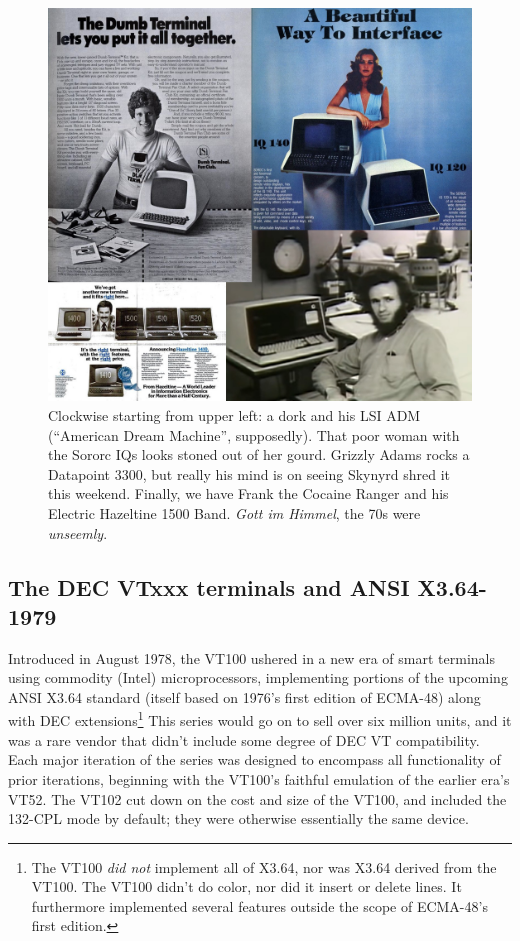 \documentclass[letterpaper,10pt]{article}
\begin{document}
\begin{figure}
  \centering \includegraphics[width=.9\linewidth]{media/dumbterminals.jpg}
\caption{Clockwise starting from upper left: a dork and his LSI ADM (``American
  Dream Machine'', supposedly). That poor woman with the Sororc IQs looks stoned out
  of her gourd. Grizzly Adams rocks a Datapoint 3300, but really his mind is on
  seeing Skynyrd shred it this weekend. Finally, we have Frank the Cocaine
  Ranger and his Electric Hazeltine 1500 Band. \textit{Gott im Himmel}, the 70s were \textit{unseemly}.}
\end{figure}

\subsection{The DEC VTxxx terminals and ANSI X3.64-1979}

Introduced in August 1978, the VT100 ushered in a new era of smart terminals
using commodity (Intel) microprocessors, implementing portions of the upcoming
ANSI X3.64 standard (itself based on 1976's first edition of ECMA-48) along
with DEC extensions\footnote{The VT100 \textit{did not} implement all of X3.64,
nor was X3.64 derived from the VT100. The VT100 didn't do color, nor did it
insert or delete lines. It furthermore implemented several features outside
the scope of ECMA-48's first edition.} This series would go on to sell over
six million units, and it was a rare vendor that didn't include some degree
of DEC VT compatibility. Each major iteration of the series was designed to
encompass all functionality of prior iterations, beginning with the VT100's
faithful emulation of the earlier era's VT52. The VT102 cut down on the cost
and size of the VT100, and included the 132-CPL mode by default; they were
otherwise essentially the same device\cite{vt100}.
\end{document}
